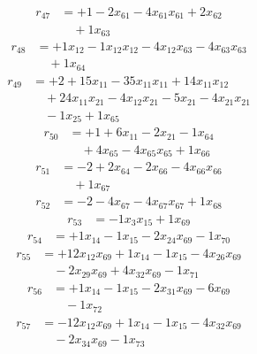 \[\begin{aligned}
r_{47} &= + 1 - 2 x_{61} - 4 x_{61} x_{61} + 2 x_{62} \\
 &\quad + 1 x_{63}
\end{aligned}\]
\[\begin{aligned}
r_{48} &= + 1 x_{12} - 1 x_{12} x_{12} - 4 x_{12} x_{63} - 4 x_{63} x_{63} \\
 &\quad + 1 x_{64}
\end{aligned}\]
\[\begin{aligned}
r_{49} &= + 2 + 15 x_{11} - 35 x_{11} x_{11} + 14 x_{11} x_{12} \\
 &\quad + 24 x_{11} x_{21} - 4 x_{12} x_{21} - 5 x_{21} - 4 x_{21} x_{21} \\
 &\quad - 1 x_{25} + 1 x_{65}
\end{aligned}\]
\[\begin{aligned}
r_{50} &= + 1 + 6 x_{11} - 2 x_{21} - 1 x_{64} \\
 &\quad + 4 x_{65} - 4 x_{65} x_{65} + 1 x_{66}
\end{aligned}\]
\[\begin{aligned}
r_{51} &= - 2 + 2 x_{64} - 2 x_{66} - 4 x_{66} x_{66} \\
 &\quad + 1 x_{67}
\end{aligned}\]
\[\begin{aligned}
r_{52} &= - 2 - 4 x_{67} - 4 x_{67} x_{67} + 1 x_{68}
\end{aligned}\]
\[\begin{aligned}
r_{53} &= - 1 x_{3} x_{15} + 1 x_{69}
\end{aligned}\]
\[\begin{aligned}
r_{54} &= + 1 x_{14} - 1 x_{15} - 2 x_{24} x_{69} - 1 x_{70}
\end{aligned}\]
\[\begin{aligned}
r_{55} &= + 12 x_{12} x_{69} + 1 x_{14} - 1 x_{15} - 4 x_{26} x_{69} \\
 &\quad - 2 x_{29} x_{69} + 4 x_{32} x_{69} - 1 x_{71}
\end{aligned}\]
\[\begin{aligned}
r_{56} &= + 1 x_{14} - 1 x_{15} - 2 x_{31} x_{69} - 6 x_{69} \\
 &\quad - 1 x_{72}
\end{aligned}\]
\[\begin{aligned}
r_{57} &= - 12 x_{12} x_{69} + 1 x_{14} - 1 x_{15} - 4 x_{32} x_{69} \\
 &\quad - 2 x_{34} x_{69} - 1 x_{73}
\end{aligned}\]
